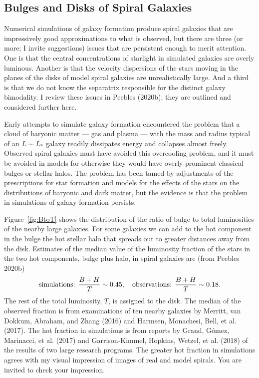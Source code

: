 \documentclass[fleqn,12pt]{article}
\newcommand{\beq}{\begin{equation}}
\newcommand{\eeq}{\end{equation}}
\begin{document}
\subsection{Bulges and Disks of Spiral Galaxies}\label{sec:spirals}

 Numerical simulations of galaxy formation produce spiral galaxies that are impressively good approximations to what is observed, but there are three (or more; I invite suggestions) issues that are persistent enough to merit attention. One is that the central concentrations of starlight in simulated galaxies are overly luminous. Another is that the velocity dispersions of the stars moving in the planes of the disks of model spiral galaxies are unrealistically large. And a third is that we do not know the separatrix responsible for the distinct galaxy bimodality. I review these issues in Peebles (2020b); they are outlined and considered further here. 

Early attempts to simulate galaxy formation encountered the problem that a cloud of baryonic matter --- gas and plasma --- with the mass and radius typical of an $L\sim L_\ast$ galaxy readily dissipates energy and collapses almost freely. Observed spiral galaxies must have avoided this overcooling problem, and it must be avoided in models for otherwise they would have overly prominent classical bulges or stellar halos. The problem has been tamed by adjustments of the prescriptions for star formation and models for the effects of the stars on the distributions of baryonic and dark matter, but the evidence is that the problem in simulations of galaxy formation persists.

Figure~\ref{fig:BtoT} shows the distribution of the ratio of bulge to total luminosities of the nearby large galaxies. For some galaxies we can add to the hot component in the bulge the hot stellar halo that spreads out to greater distances away from the disk. Estimates of the median value of the luminosity fraction of the stars in the two hot components, bulge plus halo, in spiral galaxies are (from Peebles 2020b)
\beq
\hbox{simulations: }{B+H\over T}\sim 0.45,\quad \hbox{observations: }{B+H\over T}\sim 0.18. \label{eq:BHoverT}
\eeq
The rest of the total luminosity, $T$, is assigned to the disk. The median of the  observed fraction is from examinations of ten nearby galaxies by Merritt, van Dokkum, Abraham, and Zhang (2016) and Harmsen, Monachesi, Bell, et al. (2017). The hot  fraction in simulations is from reports by Grand, G{\'o}mez, Marinacci, et al. (2017) and Garrison-Kimmel, Hopkins, Wetzel, et al. (2018) of the results of two large research programs. The greater hot fraction in simulations agrees with my visual impression of images of real and model spirals. You are invited to check your impression. 
\end{document}
